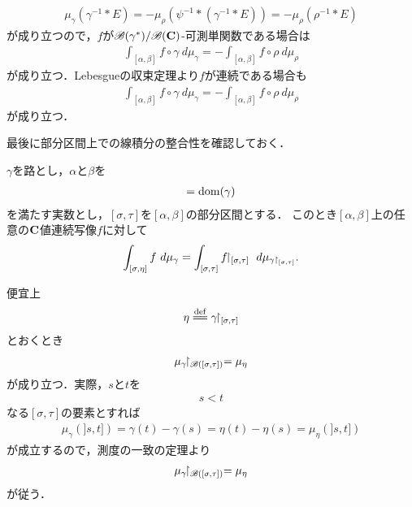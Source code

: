 \begin{sketch}
		\begin{align}
			\mu_{\gamma}\left(\gamma^{-1} \ast E\right) = -\mu_{\rho}\left(\psi^{-1} \ast (\gamma^{-1} \ast E)\right)
			= -\mu_{\rho}\left(\rho^{-1} \ast E\right)
		\end{align}
		が成り立つので，$f$が$\mathscr{B}(\gamma^*)/\mathscr{B}(\mathbf{C})$-可測単関数である場合は
		\begin{align}
			\int_{[\alpha,\beta]} f \circ \gamma\ d\mu_{\gamma} = -\int_{[\alpha,\beta]} f \circ \rho\ d\mu_{\rho}
		\end{align}
		が成り立つ．Lebesgueの収束定理より$f$が連続である場合も
		\begin{align}
			\int_{[\alpha,\beta]} f \circ \gamma\ d\mu_{\gamma} = -\int_{[\alpha,\beta]} f \circ \rho\ d\mu_{\rho}
		\end{align}
		が成り立つ．
		\QED
	\end{sketch}
	
	最後に部分区間上での線積分の整合性を確認しておく．
	\begin{screen}
		\begin{thm}[部分区間上の線積分との整合性]
		\label{thm:consistency_of_contour_integral_on_sub_interval}
			$\gamma$を路とし，$\alpha$と$\beta$を
			\begin{align}
				[\alpha,\beta] = \dom{\gamma}
			\end{align}
			を満たす実数とし，$[\sigma,\tau]$を$[\alpha,\beta]$の部分区間とする．
			このとき$[\alpha,\beta]$上の任意の$\mathbf{C}$値連続写像$f$に対して
			\begin{align}
				\int_{[\sigma,\eta]} f\ d\mu_{\gamma} = \int_{[\sigma,\tau]} f\hspace{-0.41em}\upharpoonright_{[\sigma,\tau]}\ d\mu_{\gamma \upharpoonright_{[\sigma,\tau]}}.
			\end{align}
		\end{thm}
	\end{screen}
	
	\begin{sketch}
		便宜上
		\begin{align}
			\eta \defeq \gamma \rest_{[\sigma,\tau]}
		\end{align}
		とおくとき
		\begin{align}
			\mu_{\gamma} \hspace{-0.41em}\upharpoonright_{\mathscr{B}([\sigma,\tau])} = \mu_{\eta}
		\end{align}
		が成り立つ．実際，$s$と$t$を
		\begin{align}
			s < t
		\end{align}
		なる$[\sigma,\tau]$の要素とすれば
		\begin{align}
			\mu_{\gamma}(]s,t]) = \gamma(t) - \gamma(s) = \eta(t) - \eta(s) = \mu_{\eta}(]s,t])
		\end{align}
		が成立するので，測度の一致の定理より
		\begin{align}
			\mu_{\gamma}\hspace{-0.41em}\upharpoonright_{\mathscr{B}([\sigma,\tau])} = \mu_{\eta}
		\end{align}
		が従う．
		\QED
	\end{sketch}